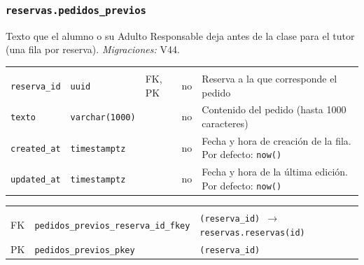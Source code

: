 \subsubsection{\texorpdfstring{\texttt{reservas.pedidos\_\allowbreak{}previos}}{reservas.pedidos\_previos}}\label{dd:reservas.pedidos_previos}

Texto que el alumno o su Adulto Responsable deja antes de la clase para el tutor (una fila por reserva). \emph{Migraciones:} V44.

{\small
\begin{xltabular}{\textwidth}{@{}>{\raggedright\arraybackslash}p{3.6cm} >{\raggedright\arraybackslash}p{2.3cm} >{\raggedright\arraybackslash}p{1cm} >{\centering\arraybackslash}p{0.85cm} L@{}}
    \toprule
     &  &  &  &  \\
    \midrule
    \endfirsthead
    \toprule
     &  &  &  &  \\
    \midrule
    \endhead
    \bottomrule
    \endfoot
    \texttt{reserva\_\allowbreak{}id} & \texttt{uuid} & FK, PK & no & Reserva a la que corresponde el pedido \\
    \texttt{texto} & \texttt{varchar(\allowbreak{}1000)} &  & no & Contenido del pedido (hasta 1000 caracteres) \\
    \texttt{created\_\allowbreak{}at} & \texttt{timestamptz} &  & no & Fecha y hora de creación de la fila. Por defecto: \texttt{now(\allowbreak{})} \\
    \texttt{updated\_\allowbreak{}at} & \texttt{timestamptz} &  & no & Fecha y hora de la última edición. Por defecto: \texttt{now(\allowbreak{})} \\
\end{xltabular}
}

{\small
\begin{xltabular}{\textwidth}{@{}>{\raggedright\arraybackslash}p{1.7cm} >{\raggedright\arraybackslash}p{4.6cm} L@{}}
    \toprule
     &  &  \\
    \midrule
    \endfirsthead
    \toprule
     &  &  \\
    \midrule
    \endhead
    \bottomrule
    \endfoot
    FK & \texttt{pedidos\_\allowbreak{}previos\_\allowbreak{}reserva\_\allowbreak{}id\_\allowbreak{}fkey} & \texttt{(\allowbreak{}reserva\_\allowbreak{}id) $\rightarrow$ reservas.reservas(\allowbreak{}id)} \\
    PK & \texttt{pedidos\_\allowbreak{}previos\_\allowbreak{}pkey} & \texttt{(\allowbreak{}reserva\_\allowbreak{}id)} \\
\end{xltabular}
}

